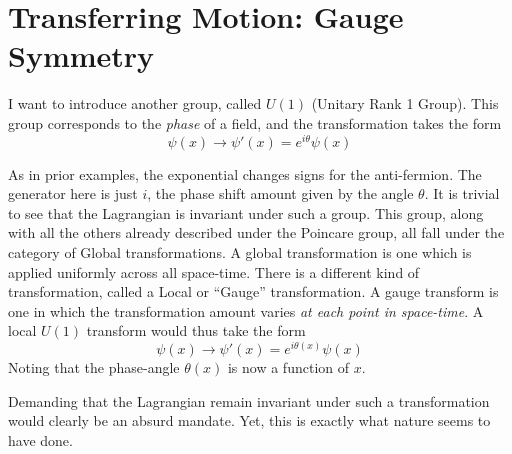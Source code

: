 \section{Transferring Motion: Gauge Symmetry}

    I want to introduce another group, called $U(1)$ (Unitary Rank 1 Group).
    This group corresponds to the \textit{phase} of a field, and the transformation takes the form
    \begin{equation}
        \psi(x) \to \psi'(x) = e^{i\theta} \psi(x)
    \end{equation}

    As in prior examples, the exponential changes signs for the anti-fermion.
    The generator here is just $i$, the phase shift amount given by the angle $\theta$.
    It is trivial to see that the Lagrangian is invariant under such a group.
    This group, along with all the others already described under the Poincare group,
        all fall under the category of Global transformations.
    A global transformation is one which is applied uniformly across all space-time.
    There is a different kind of transformation, called a Local or ``Gauge'' transformation.
    A gauge transform is one in which the transformation amount varies \textit{at each point in space-time}.
    A local $U(1)$ transform would thus take the form 
    \begin{equation}
        \psi(x) \to \psi'(x) = e^{i\theta(x)} \psi(x)
    \end{equation}
    Noting that the phase-angle $\theta(x)$ is now a function of $x$.

    Demanding that the Lagrangian remain invariant under such a transformation would clearly be an absurd mandate.
    Yet, this is exactly what nature seems to have done.


